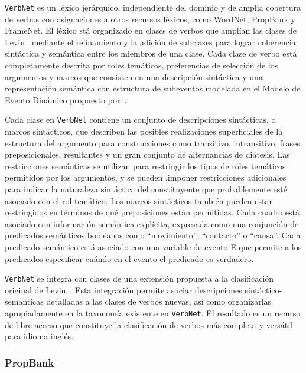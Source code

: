 \texttt{VerbNet} es un léxico jerárquico, independiente del dominio y de amplia cobertura de verbos con asignaciones a otros recursos léxicos, como WordNet, PropBank y FrameNet.
El léxico stá organizado en clases de verbos que amplían las clases de Levin~\cite{levin1993english} mediante el refinamiento y la adición de subclases para lograr coherencia sintáctica y semántica entre los miembros de una clase.
Cada clase de verbo está completamente descrita por roles temáticos, preferencias de selección de los argumentos y marcos que consisten en una descripción sintáctica y una representación semántica con estructura de subeventos modelada en el Modelo de Evento Dinámico propuesto por~\citet{pustejovsky2013dynamic}.

Cada clase en \texttt{VerbNet} contiene un conjunto de descripciones sintácticas, o marcos sintácticos, que describen las posibles realizaciones superficiales de la estructura del argumento para construcciones como transitivo, intransitivo, frases preposicionales, resultantes y un gran conjunto de alternancias de diátesis.
Las restricciones semánticas se utilizan para restringir los tipos de roles temáticos permitidos por los argumentos, y se pueden ,imponer restricciones adicionales para indicar la naturaleza sintáctica del constituyente que probablemente esté asociado con el rol temático.
Los marcos sintácticos también pueden estar restringidos en términos de qué preposiciones están permitidas.
Cada cuadro está asociado con información semántica explícita, expresada como una conjunción de predicados semánticos booleanos como ``movimiento'', ``contacto'' o ``causa''.
Cada predicado semántico está asociado con una variable de evento E que permite a los predicados especificar cuándo en el evento el predicado es verdadero.

\texttt{VerbNet} se integra con clases de una extensión propuesta a la clasificación original de Levin~\cite{kipper2006extending}.
Esta integración permite asociar descripciones sintáctico-semánticas detalladas a las clases de verbos nuevas, así como organizarlas apropiadamente en la taxonomía existente en \texttt{VerbNet}.
El resultado es un recurso de libre acceso que constituye la clasificación de verbos más completa y versátil para idioma inglés.

\subsubsection*{PropBank}

